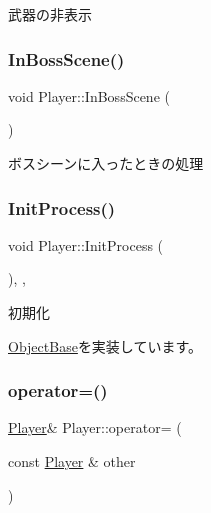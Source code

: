 武器の非表示 

\mbox{\label{class_player_aff4d2bffe97e2b70f47f5eac2da26562}} 
\subsubsection{\texorpdfstring{In\+Boss\+Scene()}{InBossScene()}}
{\footnotesize\ttfamily void Player\+::\+In\+Boss\+Scene (\begin{DoxyParamCaption}{ }\end{DoxyParamCaption})\hspace{0.3cm}{\ttfamily [inline]}}



ボスシーンに入ったときの処理 

\mbox{\label{class_player_a1051f85c8bf18a256d275d1a1dee5da6}} 
\subsubsection{\texorpdfstring{Init\+Process()}{InitProcess()}}
{\footnotesize\ttfamily void Player\+::\+Init\+Process (\begin{DoxyParamCaption}{ }\end{DoxyParamCaption})\hspace{0.3cm}{\ttfamily [final]}, {\ttfamily [protected]}, {\ttfamily [virtual]}}



初期化 



\mbox{\hyperlink{class_object_base_af133f36f2bca1dcfd962e2cfac61ab51}{Object\+Base}}を実装しています。

\mbox{\label{class_player_a8868988ae751daed5cfa32627e78889b}} 
\subsubsection{\texorpdfstring{operator=()}{operator=()}}
{\footnotesize\ttfamily \mbox{\hyperlink{class_player}{Player}}\& Player\+::operator= (\begin{DoxyParamCaption}\item[{const \mbox{\hyperlink{class_player}{Player}} \&}]{other }\end{DoxyParamCaption})\hspace{0.3cm}{\ttfamily [inline]}}



